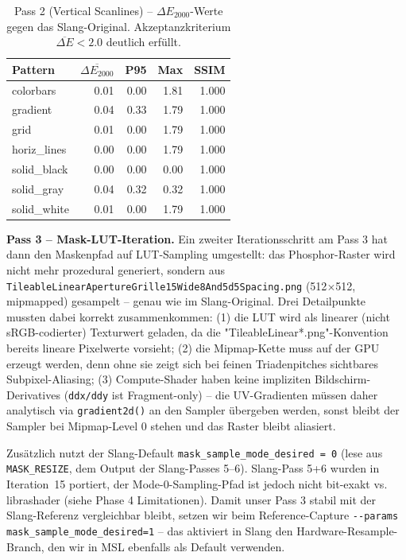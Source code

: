 \documentclass[11pt, a4paper]{article}
\newcommand{\tableheadercolor}{\rowcolor{hkared}}
\newcommand{\thw}[1]{\color{white}\textbf{#1}}  %
\begin{document}
\vspace{.25cm}
\begin{table}[H]
\centering
\small
{}
\begin{tabularx}{\textwidth}{lrrrr}
    \toprule
    \tableheadercolor \thw{Pattern} & \thw{$\overline{\Delta E_{2000}}$} & \thw{P95} & \thw{Max} & \thw{SSIM} \\
    \midrule
    colorbars   & 0.01 & 0.00 & 1.81 & 1.000 \\
    gradient    & 0.04 & 0.33 & 1.79 & 1.000 \\
    grid        & 0.01 & 0.00 & 1.79 & 1.000 \\
    horiz\_lines & 0.00 & 0.00 & 1.79 & 1.000 \\
    solid\_black & 0.00 & 0.00 & 0.00 & 1.000 \\
    solid\_gray  & 0.04 & 0.32 & 0.32 & 1.000 \\
    solid\_white & 0.01 & 0.00 & 1.79 & 1.000 \\
    \bottomrule
\end{tabularx}
 \vspace{.25cm}
\caption{Pass 2 (Vertical Scanlines) -- $\Delta E_{2000}$-Werte gegen das Slang-Original. Akzeptanzkriterium $\overline{\Delta E} < 2.0$ deutlich erf\"ullt.}
\label{tab:dE-pass2}
\end{table}

\vspace{.25cm}
\textbf{Pass 3 -- Mask-LUT-Iteration.} Ein zweiter Iterationsschritt am Pass 3 hat dann den Maskenpfad auf LUT-Sampling umgestellt: das Phosphor-Raster wird nicht mehr prozedural generiert, sondern aus \texttt{TileableLinearApertureGrille15Wide8And5d5Spacing.png} (512$\times$512, mipmapped) gesampelt -- genau wie im Slang-Original. Drei Detailpunkte mussten dabei korrekt zusammenkommen: (1) die LUT wird als linearer (nicht sRGB-codierter) Texturwert geladen, da die "TileableLinear*.png"-Konvention bereits lineare Pixelwerte vorsieht; (2) die Mipmap-Kette muss auf der GPU erzeugt werden, denn ohne sie zeigt sich bei feinen Triadenpitches sichtbares Subpixel-Aliasing; (3) Compute-Shader haben keine impliziten Bildschirm-Derivatives (\verb|ddx/ddy| ist Fragment-only) -- die UV-Gradienten m\"ussen daher analytisch via \texttt{gradient2d()} an den Sampler übergeben werden, sonst bleibt der Sampler bei Mipmap-Level 0 stehen und das Raster bleibt aliasiert.

Zus\"atzlich nutzt der Slang-Default \texttt{mask\_sample\_mode\_desired = 0} (lese aus \texttt{MASK\_RESIZE}, dem Output der Slang-Passes 5--6). Slang-Pass 5+6 wurden in Iteration~15 portiert, der Mode-0-Sampling-Pfad ist jedoch nicht bit-exakt vs. librashader (siehe Phase 4 Limitationen). Damit unser Pass 3 stabil mit der Slang-Referenz vergleichbar bleibt, setzen wir beim Reference-Capture \verb|--params mask_sample_mode_desired=1| -- das aktiviert in Slang den Hardware-Resample-Branch, den wir in MSL ebenfalls als Default verwenden.
\end{document}

